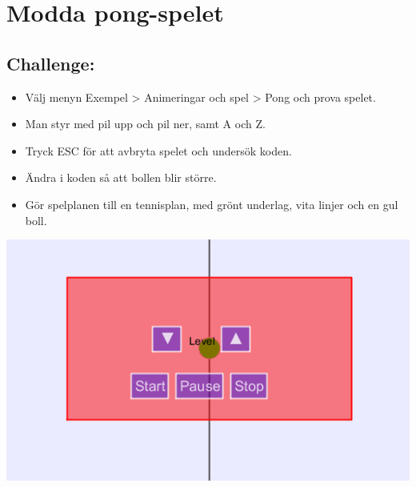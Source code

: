 \chapter{Modda pong-spelet}
\begin{multicols}{2}
\section*{\color{BrickRed}Challenge:}


\begin{itemize}

\item {Välj menyn Exempel > Animeringar och spel > Pong och prova spelet.}
\item {Man styr med pil upp och pil ner, samt A och Z.}
\item {Tryck ESC för att avbryta spelet och undersök koden.}
\item {Ändra i koden så att bollen blir större.}
\item {Gör spelplanen till en tennisplan, med grönt underlag, vita linjer och en gul boll.}

\end{itemize}



\columnbreak

\begin{center}
\includegraphics{../img/pong.png}
\end{center}

\end{multicols}

